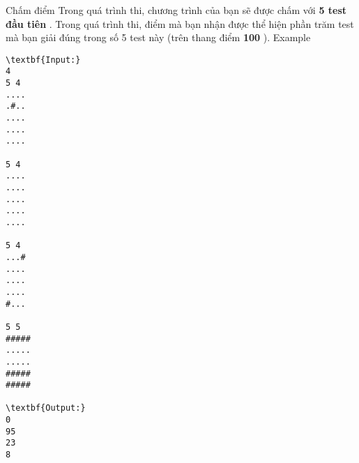 Chấm điểm
Trong quá trình thi, chương trình của bạn sẽ được chấm với   \textbf{    5 test đầu tiên   }   . Trong quá trình thi, điểm mà bạn nhận được thể hiện phần trăm test mà bạn giải đúng trong số 5 test này (trên thang điểm   \textbf{    100   }   ).
Example
\begin{verbatim}
\textbf{Input:}
4
5 4
....
.#..
....
....
....

5 4
....
....
....
....
....

5 4
...#
....
....
....
#...

5 5
#####
.....
.....
#####
#####

\textbf{Output:}
0
95
23
8
\end{verbatim}